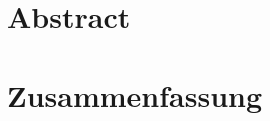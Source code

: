 \chapter*{Abstract}
\label{ch:abstract}

\chapter*{Zusammenfassung}
\label{ch:zusammenfassung}
\begin{otherlanguage}{ngerman}
\end{otherlanguage}
